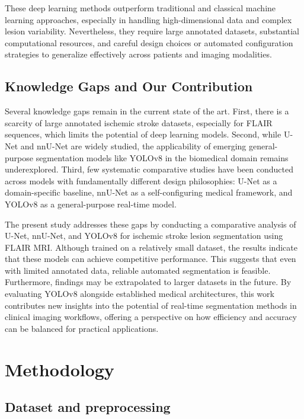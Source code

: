 \documentclass[12pt]{article}
\begin{document}
These deep learning methods outperform traditional and classical machine learning approaches, especially in handling high-dimensional data and complex lesion variability. Nevertheless, they require large annotated datasets, substantial computational resources, and careful design choices or automated configuration strategies to generalize effectively across patients and imaging modalities.

\subsection{Knowledge Gaps and Our Contribution} \label{subsec:gaps}

Several knowledge gaps remain in the current state of the art. First, there is a scarcity of large annotated ischemic stroke datasets, especially for FLAIR sequences, which limits the potential of deep learning models. Second, while U-Net and nnU-Net are widely studied, the applicability of emerging general-purpose segmentation models like YOLOv8 in the biomedical domain remains underexplored. Third, few systematic comparative studies have been conducted across models with fundamentally different design philosophies: U-Net as a domain-specific baseline, nnU-Net as a self-configuring medical framework, and YOLOv8 as a general-purpose real-time model.

The present study addresses these gaps by conducting a comparative analysis of U-Net, nnU-Net, and YOLOv8 for ischemic stroke lesion segmentation using FLAIR MRI. Although trained on a relatively small dataset, the results indicate that these models can achieve competitive performance. This suggests that even with limited annotated data, reliable automated segmentation is feasible. Furthermore, findings may be extrapolated to larger datasets in the future. By evaluating YOLOv8 alongside established medical architectures, this work contributes new insights into the potential of real-time segmentation methods in clinical imaging workflows, offering a perspective on how efficiency and accuracy can be balanced for practical applications.

\section{Methodology} \label{sec:methodology}

\subsection{Dataset and preprocessing} \label{subsec:dataset}
\end{document}
